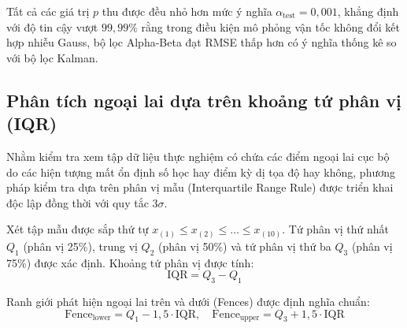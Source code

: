 \begin{table}[H]
\centering
\caption{Kết quả kiểm định Student theo cặp so sánh Alpha-Beta và Kalman ($n=10$)}
\label{tab:paired-t-test}
\end{table}

Tất cả các giá trị $p$ thu được đều nhỏ hơn mức ý nghĩa $\alpha_{\text{test}} = 0{,}001$, khẳng định với độ tin cậy vượt $99{,}99\%$ rằng trong điều kiện mô phỏng vận tốc không đổi kết hợp nhiễu Gauss, bộ lọc Alpha-Beta đạt RMSE thấp hơn có ý nghĩa thống kê so với bộ lọc Kalman.

\subsection{Phân tích ngoại lai dựa trên khoảng tứ phân vị (IQR)}

\hspace{0.5cm} Nhằm kiểm tra xem tập dữ liệu thực nghiệm có chứa các điểm ngoại lai cục bộ do các hiện tượng mất ổn định số học hay điểm kỳ dị tọa độ hay không, phương pháp kiểm tra dựa trên phân vị mẫu (Interquartile Range Rule) được triển khai độc lập đồng thời với quy tắc $3\sigma$.

Xét tập mẫu được sắp thứ tự $x_{(1)} \le x_{(2)} \le \dots \le x_{(10)}$. Tứ phân vị thứ nhất $Q_1$ (phân vị 25\%), trung vị $Q_2$ (phân vị 50\%) và tứ phân vị thứ ba $Q_3$ (phân vị 75\%) được xác định. Khoảng tứ phân vị được tính:
\begin{equation}
\text{IQR} = Q_3 - Q_1
\label{eq:iqr}
\end{equation}

Ranh giới phát hiện ngoại lai trên và dưới (Fences) được định nghĩa chuẩn:
\begin{equation}
\text{Fence}_{\text{lower}} = Q_1 - 1{,}5 \cdot \text{IQR}, \quad \text{Fence}_{\text{upper}} = Q_3 + 1{,}5 \cdot \text{IQR}
\label{eq:fences}
\end{equation}

